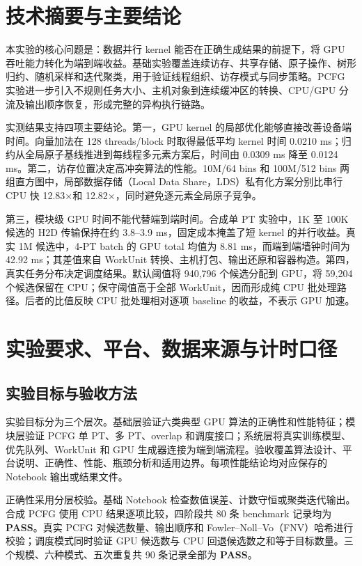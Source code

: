 \documentclass[UTF8,11pt,a4paper]{ctexart}
\newcommand{\pass}{\textcolor{Green!70!black}{\textbf{PASS}}}
\begin{document}
\setcounter{tocdepth}{1}
\tableofcontents
\clearpage

\section{技术摘要与主要结论}

本实验的核心问题是：数据并行 kernel 能否在正确生成结果的前提下，将 GPU 吞吐能力转化为端到端收益。基础实验覆盖连续访存、共享存储、原子操作、树形归约、随机采样和迭代聚类，用于验证线程组织、访存模式与同步策略。PCFG 实验进一步引入不规则任务大小、主机对象到连续缓冲区的转换、CPU/GPU 分流及输出顺序恢复，形成完整的异构执行链路。

实测结果支持四项主要结论。第一，GPU kernel 的局部优化能够直接改善设备端时间。向量加法在 128 threads/block 时取得最低平均 kernel 时间 0.0210 ms；归约从全局原子基线推进到每线程多元素方案后，时间由 0.0309 ms 降至 0.0124 ms。第二，访存位置决定高冲突算法的性能。10M/64 bins 和 100M/512 bins 两组直方图中，局部数据存储（Local Data Share，LDS）私有化方案分别比串行 CPU 快 12.83×和 12.82×，同时避免逐元素全局原子竞争。

第三，模块级 GPU 时间不能代替端到端时间。合成单 PT 实验中，1K 至 100K 候选的 H2D 传输保持在约 3.8--3.9 ms，固定成本掩盖了短 kernel 的并行收益。真实 1M 候选中，4-PT batch 的 GPU total 均值为 8.81 ms，而端到端墙钟时间为 42.92 ms；其差值来自 WorkUnit 转换、主机打包、输出还原和容器构造。第四，真实任务分布决定调度结果。默认阈值将 940,796 个候选分配到 GPU，将 59,204 个候选保留在 CPU；保守阈值高于全部 WorkUnit，因而形成纯 CPU 批处理路径。后者的比值反映 CPU 批处理相对逐项 baseline 的收益，不表示 GPU 加速。

\section{实验要求、平台、数据来源与计时口径}

\subsection{实验目标与验收方法}

实验目标分为三个层次。基础层验证六类典型 GPU 算法的正确性和性能特征；模块层验证 PCFG 单 PT、多 PT、overlap 和调度接口；系统层将真实训练模型、优先队列、WorkUnit 和 GPU 生成器连接为端到端流程。验收覆盖算法设计、平台说明、正确性、性能、瓶颈分析和适用边界。每项性能结论均对应保存的 Notebook 输出或结果文件。

正确性采用分层校验。基础 Notebook 检查数值误差、计数守恒或聚类迭代输出。合成 PCFG 使用 CPU 结果逐项比较，四阶段共 80 条 benchmark 记录均为 \pass。真实 PCFG 对候选数量、输出顺序和 Fowler--Noll--Vo（FNV）哈希进行校验；调度模式同时验证 GPU 候选数与 CPU 回退候选数之和等于目标数量。三个规模、六种模式、五次重复共 90 条记录全部为 \pass。
\end{document}

